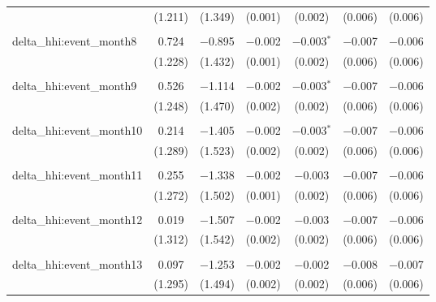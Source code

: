\begin{table}[H]
{\begin{tabular}{@{\extracolsep{5pt}}lcccccc}
   & (1.211) & (1.349) & (0.001) & (0.002) & (0.006) & (0.006) \\  

   & & & & & & \\  

  delta\_hhi:event\_month8 & 0.724 & $-$0.895 & $-$0.002 & $-$0.003$^{*}$ & $-$0.007 & $-$0.006 \\  

   & (1.228) & (1.432) & (0.001) & (0.002) & (0.006) & (0.006) \\  

   & & & & & & \\  

  delta\_hhi:event\_month9 & 0.526 & $-$1.114 & $-$0.002 & $-$0.003$^{*}$ & $-$0.007 & $-$0.006 \\  

   & (1.248) & (1.470) & (0.002) & (0.002) & (0.006) & (0.006) \\  

   & & & & & & \\  

  delta\_hhi:event\_month10 & 0.214 & $-$1.405 & $-$0.002 & $-$0.003$^{*}$ & $-$0.007 & $-$0.006 \\  

   & (1.289) & (1.523) & (0.002) & (0.002) & (0.006) & (0.006) \\  

   & & & & & & \\  

  delta\_hhi:event\_month11 & 0.255 & $-$1.338 & $-$0.002 & $-$0.003 & $-$0.007 & $-$0.006 \\  

   & (1.272) & (1.502) & (0.001) & (0.002) & (0.006) & (0.006) \\  

   & & & & & & \\  

  delta\_hhi:event\_month12 & 0.019 & $-$1.507 & $-$0.002 & $-$0.003 & $-$0.007 & $-$0.006 \\  

   & (1.312) & (1.542) & (0.002) & (0.002) & (0.006) & (0.006) \\  

   & & & & & & \\  

  delta\_hhi:event\_month13 & 0.097 & $-$1.253 & $-$0.002 & $-$0.002 & $-$0.008 & $-$0.007 \\  

   & (1.295) & (1.494) & (0.002) & (0.002) & (0.006) & (0.006) \\  


\end{tabular}}
\end{table}
